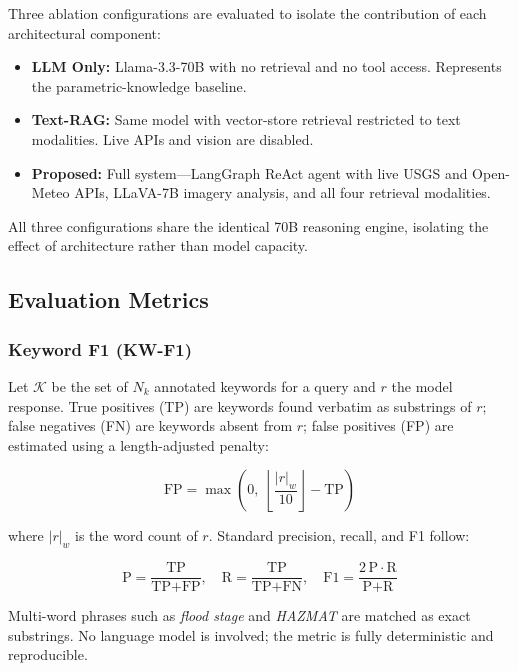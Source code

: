 \documentclass[conference]{IEEEtran}
\begin{document}
Three ablation configurations are evaluated to isolate the contribution of
each architectural component:
\begin{itemize}
  \item \textbf{LLM Only:} Llama-3.3-70B with no retrieval and no tool access.
        Represents the parametric-knowledge baseline.
  \item \textbf{Text-RAG:} Same model with vector-store retrieval restricted to
        text modalities. Live APIs and vision are disabled.
  \item \textbf{Proposed:} Full system---LangGraph ReAct agent with live USGS
        and Open-Meteo APIs, LLaVA-7B imagery analysis, and all four retrieval
        modalities.
\end{itemize}
All three configurations share the identical 70B reasoning engine, isolating
the effect of architecture rather than model capacity.

\subsection{Evaluation Metrics}

\subsubsection{Keyword F1 (KW-F1)}

Let $\mathcal{K}$ be the set of $N_k$ annotated keywords for a query and $r$
the model response. True positives (TP) are keywords found verbatim as
substrings of $r$; false negatives (FN) are keywords absent from $r$; false
positives (FP) are estimated using a length-adjusted penalty:

\begin{equation}
  \text{FP} = \max\!\left(0,\;\left\lfloor \frac{|r|_w}{10}\right\rfloor
               - \text{TP}\right)
  \label{eq:fp}
\end{equation}

\noindent where $|r|_w$ is the word count of $r$. Standard precision, recall,
and F1 follow:

\begin{equation}
  \text{P} = \frac{\text{TP}}{\text{TP}+\text{FP}},\quad
  \text{R} = \frac{\text{TP}}{\text{TP}+\text{FN}},\quad
  \text{F1} = \frac{2\,\text{P}\cdot\text{R}}{\text{P}+\text{R}}
  \label{eq:f1}
\end{equation}

\noindent Multi-word phrases such as \textit{flood stage} and \textit{HAZMAT}
are matched as exact substrings. No language model is involved; the metric is
fully deterministic and reproducible.
\end{document}
